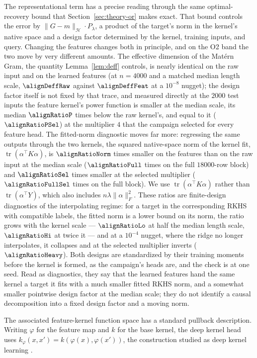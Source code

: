 The representational term has a precise reading through the same
optimal-recovery bound that Section~\ref{sec:theory-or} makes exact. That
bound controls the error by $\|G-m\|_{\mathcal H}\cdot P_\lambda$, a product of
the target's norm in the kernel's native space and a design factor determined by the kernel, training inputs, and query. Changing the features changes both in principle, and on the
O2 band the two move by very different amounts. The effective dimension of
the Mat\'ern Gram, the quantity Lemma~\ref{lem:deff} controls, is nearly
identical on the raw input and on the learned features (at $n=4000$ and a
matched median length scale, $\alignDeffRaw$ against $\alignDeffFeat$ at a
$10^{-8}$ nugget); the design factor itself is not fixed by that trace, and
measured directly at the $2000$ test inputs the feature kernel's power
function is smaller at the median scale, its median $\alignRatioP$ times
below the raw kernel's, and equal to it ($\alignRatioPSel$) at the
multiplier $4$ that the campaign selected for every feature head. The
fitted-norm diagnostic moves far more: regressing the same outputs through
the two kernels, the squared native-space norm of the kernel fit,
$\operatorname{tr}(\alpha^\top K\alpha)$, is $\alignRatioNorm$ times
smaller on the features than on the raw input at the median scale
($\alignRatioFull$ times on the full $18000$-row block) and
$\alignRatioSel$ times smaller at the selected multiplier ($\alignRatioFullSel$ times on the
full block). We use $\operatorname{tr}(\alpha^\top K\alpha)$ rather than
$\operatorname{tr}(\alpha^\top Y)$, which also includes
$n\lambda\|\alpha\|_F^2$. These ratios are
finite-design diagnostics of the interpolating regime: for a target in the corresponding RKHS with compatible labels, the fitted norm is a lower bound on its norm, the ratio grows with the kernel
scale --- $\alignRatioLo$ at half the median length scale, $\alignRatioHi$
at twice it --- and at a $10^{-4}$ nugget, where the ridge no longer
interpolates, it collapses and at the selected multiplier inverts
($\alignRatioHeavy$). Both designs are standardized by their training
moments before the kernel is formed, as the campaign's heads are, and the
check is at one seed. Read as diagnostics, they say that the learned features hand
the same kernel a target it fits with a much smaller fitted RKHS norm, and a somewhat smaller pointwise design factor at the median scale; they do not identify a causal
decomposition into a fixed design factor and a moving norm.

The associated feature-kernel function space has a standard pullback description.
Writing $\varphi$ for the feature map and $k$ for the base kernel, the deep
kernel head uses $k_\varphi(x,x')=k(\varphi(x),\varphi(x'))$, the construction
studied as deep kernel learning \citep{wilson2016deep,calandra2016manifold}.

